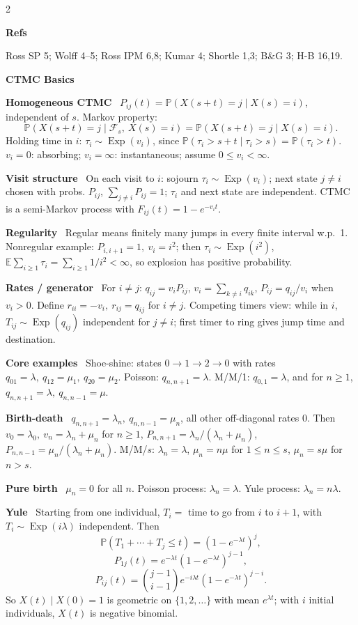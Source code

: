 \documentclass[10pt,fleqn]{article}
\newcommand{\PP}{\mathbb{P}}
\newcommand{\E}{\mathbb{E}}
\newcommand{\shead}[1]{\vspace{0.05ex}\textbf{\scriptsize #1}\par}
\newcommand{\topic}[1]{\textbf{#1}\ }
\DeclareMathOperator{\Exp}{Exp}
\begin{document}
\fontsize{5.5}{5.78}\selectfont
\sloppy
\raggedright

\begin{multicols*}{2}
\raggedcolumns

\shead{Refs}
Ross SP 5; Wolff 4--5; Ross IPM 6,8; Kumar 4; Shortle 1,3; B\&G 3; H-B 16,19.

\shead{CTMC Basics}
\topic{Homogeneous CTMC} \(P_{ij}(t)=\PP(X(s+t)=j\mid X(s)=i)\), independent of \(s\). Markov property:
\[
\PP(X(s+t)=j\mid \mathcal F_s,\ X(s)=i)=\PP(X(s+t)=j\mid X(s)=i).
\]
Holding time in \(i\): \(\tau_i\sim\Exp(v_i)\), since \(\PP(\tau_i>s+t\mid \tau_i>s)=\PP(\tau_i>t)\). \(v_i=0\): absorbing; \(v_i=\infty\): instantaneous; assume \(0\le v_i<\infty\).

\topic{Visit structure} On each visit to \(i\): sojourn \(\tau_i\sim\Exp(v_i)\); next state \(j\ne i\) chosen with probs. \(P_{ij}\), \(\sum_{j\ne i}P_{ij}=1\); \(\tau_i\) and next state are independent. CTMC is a semi-Markov process with \(F_{ij}(t)=1-e^{-v_it}\).

\topic{Regularity} Regular means finitely many jumps in every finite interval w.p.\ 1. Nonregular example: \(P_{i,i+1}=1,\ v_i=i^2\); then \(\tau_i\sim\Exp(i^2)\), \(\E\sum_{i\ge1}\tau_i=\sum_{i\ge1}1/i^2<\infty\), so explosion has positive probability.

\topic{Rates / generator} For \(i\ne j\): \(q_{ij}=v_iP_{ij}\), \(v_i=\sum_{k\ne i}q_{ik}\), \(P_{ij}=q_{ij}/v_i\) when \(v_i>0\). Define \(r_{ii}=-v_i,\ r_{ij}=q_{ij}\) for \(i\ne j\). Competing timers view: while in \(i\), \(T_{ij}\sim\Exp(q_{ij})\) independent for \(j\ne i\); first timer to ring gives jump time and destination.

\topic{Core examples} Shoe-shine: states \(0\to1\to2\to0\) with rates \(q_{01}=\lambda,\ q_{12}=\mu_1,\ q_{20}=\mu_2\). Poisson: \(q_{n,n+1}=\lambda\). M/M/1: \(q_{0,1}=\lambda\), and for \(n\ge1\), \(q_{n,n+1}=\lambda,\ q_{n,n-1}=\mu\).

\topic{Birth-death} \(q_{n,n+1}=\lambda_n,\ q_{n,n-1}=\mu_n\), all other off-diagonal rates \(0\). Then \(v_0=\lambda_0,\ v_n=\lambda_n+\mu_n\) for \(n\ge1\), \(P_{n,n+1}=\lambda_n/(\lambda_n+\mu_n)\), \(P_{n,n-1}=\mu_n/(\lambda_n+\mu_n)\). M/M/\(s\): \(\lambda_n=\lambda\), \(\mu_n=n\mu\) for \(1\le n\le s\), \(\mu_n=s\mu\) for \(n>s\).

\topic{Pure birth} \(\mu_n=0\) for all \(n\). Poisson process: \(\lambda_n=\lambda\). Yule process: \(\lambda_n=n\lambda\).

\topic{Yule} Starting from one individual, \(T_i=\) time to go from \(i\) to \(i+1\), with \(T_i\sim\Exp(i\lambda)\) independent. Then
\[
\PP(T_1+\cdots+T_j\le t)=(1-e^{-\lambda t})^j,
\]
\[
P_{1j}(t)=e^{-\lambda t}(1-e^{-\lambda t})^{j-1},
\]
\[
P_{ij}(t)=\binom{j-1}{i-1}e^{-i\lambda t}(1-e^{-\lambda t})^{j-i}.
\]
So \(X(t)\mid X(0)=1\) is geometric on \(\{1,2,\dots\}\) with mean \(e^{\lambda t}\); with \(i\) initial individuals, \(X(t)\) is negative binomial.


\end{multicols*}
\end{document}
